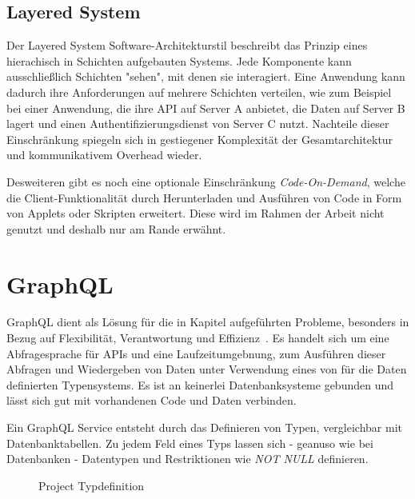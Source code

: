 \subsection{Layered System}
Der Layered System Software-Architekturstil beschreibt das Prinzip eines hierachisch in Schichten aufgebauten Systems.
Jede Komponente kann ausschließlich Schichten "sehen", mit denen sie interagiert.
Eine Anwendung kann dadurch ihre Anforderungen auf mehrere Schichten verteilen, wie zum Beispiel bei einer Anwendung, die ihre API auf Server A anbietet,
die Daten auf Server B lagert und einen Authentifizierungsdienst von Server C nutzt.
Nachteile dieser Einschränkung spiegeln sich in gestiegener Komplexität der Gesamtarchitektur und kommunikativem Overhead wieder.

Desweiteren gibt es noch eine optionale Einschränkung \emph{Code-On-Demand}, welche die Client-Funktionalität durch Herunterladen und Ausführen von Code in
Form von Applets oder Skripten erweitert. Diese wird im Rahmen der Arbeit nicht genutzt und deshalb nur am Rande erwähnt.

\section{GraphQL}
\label{sec:basics:graphql}
GraphQL dient als Lösung für die in Kapitel  aufgeführten Probleme, besonders in Bezug auf Flexibilität, Verantwortung und Effizienz~\cite{graphql-scalablepath}.
Es handelt sich um eine Abfragesprache für APIs und eine Laufzeitumgebnung,
zum Ausführen dieser Abfragen und Wiedergeben von Daten unter Verwendung eines von für die Daten definierten Typensystems.
Es ist an keinerlei Datenbanksysteme gebunden und lässt sich gut mit vorhandenen Code und Daten verbinden.

Ein GraphQL Service entsteht durch das Definieren von Typen, vergleichbar mit Datenbanktabellen. Zu jedem Feld eines Typs lassen sich - geanuso wie bei Datenbanken -
Datentypen und Restriktionen wie \emph{NOT NULL} definieren.

\begin{figure}[h]
    
    \caption{Project Typdefinition}
    \label{fig:basics:graphql:1}
\end{figure}

